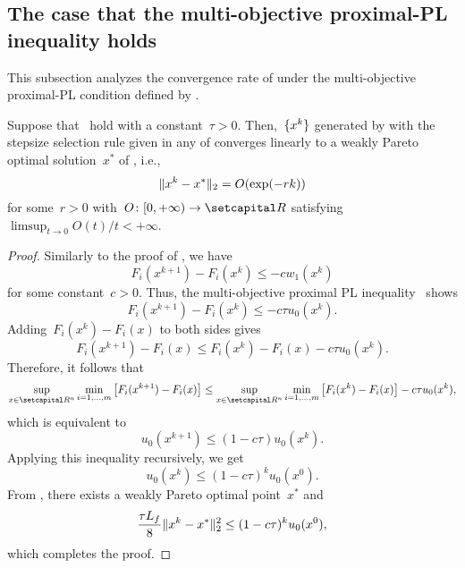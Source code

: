 \documentclass[../../main]{subfiles}
\begin{document}
\subsection{The case that the multi-objective proximal-PL inequality holds}
This subsection analyzes the convergence rate of  under the multi-objective proximal-PL condition defined by .

\begin{theorem} 
    Suppose that~ hold with a constant~$\tau > 0$.
    Then,~$\lbrace x^k\rbrace$ generated by  with the stepsize selection rule given in any of  converges linearly to a weakly Pareto optimal solution~$x^*$ of , i.e.,
    \begin{equation}
        \lVert x^k - x^*\rVert_2 = O(\exp (- r k)) 
    \end{equation}
    for some~$r > 0$ with~$O \colon [0, + \infty) \to \setR$ satisfying~$\limsup_{t \to 0} O(t) / t < + \infty$.
\end{theorem}
\begin{proof}
    Similarly to the proof of , we have
    \begin{equation}
        F_i(x^{k + 1}) - F_i(x^k) \le - c w_1(x^k)
    \end{equation}
    for some constant~$c > 0$.
    Thus, the multi-objective proximal PL inequality~ shows
    \begin{equation}
        F_i(x^{k + 1}) - F_i(x^k) \le - c \tau u_0(x^k)
    .\end{equation}
    Adding~$F_i(x^k) - F_i(x)$ to both sides gives
    \begin{equation}
        F_i(x^{k + 1}) - F_i(x) \le F_i(x^k) - F_i(x) - c \tau u_0(x^k)
    .\end{equation}
    Therefore, it follows that
    \begin{equation}
        \sup_{x \in \setR^n} \min_{i = 1, \dots, m} \left[ F_i(x^{k + 1}) - F_i(x) \right] \le \sup_{x \in \setR^n} \min_{i = 1, \dots, m} \left[ F_i(x^k) - F_i(x) \right] - c \tau u_0(x^k)
    ,\end{equation}
    which is equivalent to
    \begin{equation}
        u_0(x^{k + 1}) \le ( 1 - c \tau ) u_0(x^k)
    .\end{equation}
    Applying this inequality recursively, we get
    \begin{equation}
        u_0(x^k) \le (1 - c \tau)^k u_0(x^0)
    .\end{equation}
    From , there exists a weakly Pareto optimal point~$x^*$ and
    \begin{equation}
        \frac{\tau L_f}{8} \lVert x^k - x^*\rVert_2^2 \le (1 - c \tau)^k u_0(x^0)
    ,\end{equation}
    which completes the proof.
\end{proof}
\end{document}
